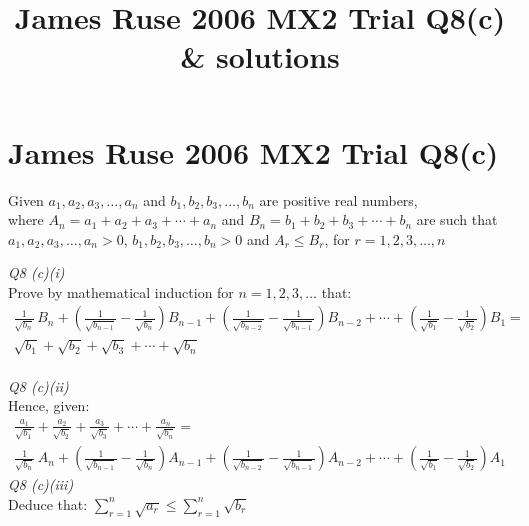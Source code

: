 \documentclass[11pt,a4paper]{article}
\title{James Ruse 2006 MX2 Trial Q8(c) & solutions}
\author{}
\date{}
\begin{document}
\section*{James Ruse 2006 MX2 Trial Q8(c)}
Given $a_1, a_2, a_3, \dots, a_n$ and $b_1, b_2, b_3, \dots, b_n$ are positive real numbers,\\
where $A_n = a_1 + a_2 + a_3 + \cdots + a_n$ and $B_n = b_1 + b_2 + b_3 + \cdots + b_n$ are such that\\
$a_1, a_2, a_3, \dots, a_n > 0$, $b_1, b_2, b_3, \dots, b_n > 0$ and $A_r \leq B_r$, for $r=1,2,3,\dots, n$

\textit{Q8 (c)(i)}\\[1em]
Prove by mathematical induction for $n=1,2,3, \dots$ that:
$$\begin{split}\frac{1}{\sqrt{b_n}}\,B_n+\left(\frac{1}{\sqrt{b_{n-1}}}-\frac{1}{\sqrt{b_n}}\right)B_{n-1}+\left(\frac{1}{\sqrt{b_{n-2}}}-\frac{1}{\sqrt{b_{n-1}}}\right)B_{n-2}
+ \cdots + \left(\frac{1}{\sqrt{b_{1}}}-\frac{1}{\sqrt{b_2}}\right)B_{1}=\\ \sqrt{b_1} + \sqrt{b_2} + \sqrt{b_3} + \cdots + \sqrt{b_n}\end{split} $$\\
\textit{Q8 (c)(ii)}\\[1em]
Hence, given:
$$\begin{split}
\frac{a_1}{\sqrt{b_1}}+\frac{a_2}{\sqrt{b_2}}+\frac{a_3}{\sqrt{b_3}}+\cdots+\frac{a_n}{\sqrt{b_n}}=\\
\frac{1}{\sqrt{b_n}}\,A_n+\left(\frac{1}{\sqrt{b_{n-1}}}-\frac{1}{\sqrt{b_n}}\right)A_{n-1}+\left(\frac{1}{\sqrt{b_{n-2}}}-\frac{1}{\sqrt{b_{n-1}}}\right)A_{n-2}
+ \cdots + \left(\frac{1}{\sqrt{b_{1}}}-\frac{1}{\sqrt{b_2}}\right)A_{1}\end{split}$$
\textit{Q8 (c)(iii)}\\[1em]
Deduce that: $\displaystyle\sum_{r=1}^{n}{\sqrt{a_r}} \leq \displaystyle\sum_{r=1}^{n}{\sqrt{b_r}}$
\end{document}

